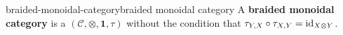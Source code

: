 \begin{topic}{braided-monoidal-category}{braided monoidal category}
    A \textbf{braided monoidal category} is a  $(\mathcal{C}, \otimes, \textbf{1}, \tau)$ without the condition that $\tau_{Y, X} \circ \tau_{X, Y} = \textup{id}_{X \otimes Y}$.
\end{topic}

